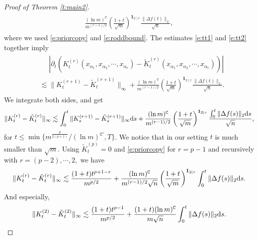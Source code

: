 \documentclass{article}
\numberwithin{equation}{section}
\newcommand{\fC}{{\mathtt C}}
\newcommand{\rd}{{\rm d}}
\newcommand{\al}{\alpha}
\renewcommand{\leq}{\leqslant}
\newcommand{\del}{\partial}
\newcommand{\1}{\mathds{1}}
\theoremstyle{plain} %
\begin{document}
\begin{proof}[Proof of Theorem \ref{t:main2}]
\begin{align}
\begin{split}
\frac{(\ln m)^\fC}{m^{(r-1)/2}}\left(\frac{1+t}{\sqrt m}\right)^{\bm1_{2\mid r}}\frac{\|\Delta f(t)\|_2}{\sqrt n},
\end{split}\end{align}
where we used \eqref{e:priorcopy} and \eqref{e:roddbound}. The estimates \eqref{e:tt1} and \eqref{e:tt2} together imply
\begin{align*}\begin{split}
&\phantom{{}={}}\left|\del_t (K_t^{(r)}(x_{\al_1}, x_{\al_2}, \cdots, x_{\al_r})- \tilde K_t^{(r)}  (x_{\al_1}, x_{\al_2}, \cdots, x_{\al_r}))\right|\\
&\lesssim  \|K_t^{(r+1)}-\tilde K_t^{(r+1)}\|_\infty+\frac{(\ln m)^\fC}{m^{(r-1)/2}}\left(\frac{1+t}{\sqrt m}\right)^{\bm1_{2\mid r}}\frac{\|\Delta f(t)\|_2}{\sqrt n}.
\end{split}\end{align*}
We integrate both sides, and get
\begin{align*}
\|K_t^{(r)}- \tilde K_t^{(r)} \|_\infty\lesssim \int_{0}^t\|K_s^{(r+1)}-\tilde K_s^{(r+1)}\|_\infty\rd s+\frac{(\ln m)^\fC}{m^{(r-1)/2}}\left(\frac{1+t}{\sqrt m}\right)^{\bm1_{2\mid r}}\frac{\int_0^t \|\Delta f(s)\|_2\rd s}{\sqrt n},
\end{align*}
for $t\leq \min\{m^{\frac{p}{2(p+1)}}/(\ln m)^{\fC'}, T\}$. 
We notice that in our setting $t$ is much smaller than $\sqrt m$. 
Using  $ \tilde K_t^{(p)}=0$ and \eqref{e:priorcopy} for $r=p-1$ and recursively with  $r= (p-2), \cdots, 2,$  we have 
\begin{align*}
\|K_t^{(r)}-\tilde K_t^{(r)} \|_\infty\lesssim \frac{(1+t)t^{p+1-r}}{m^{p/2}}+\frac{(\ln m)^\fC}{m^{(r-1)/2}\sqrt n}\left(\frac{1+t}{\sqrt m}\right)^{\bm1_{2\mid r}}\int_0^t \|\Delta f(s)\|_2\rd s.
\end{align*}
And especially,
\begin{align}\label{e:L2K}
\|K_t^{(2)}-  \tilde K_t^{(2)}  \|_\infty\lesssim \frac{(1+t)t^{p-1}}{m^{p/2}}+\frac{(1+t)(\ln m)^{\fC}}{m\sqrt {n}}\int_0^t \|\Delta f(s)\|_2\rd s.
\end{align}


\end{proof}
\end{document}
